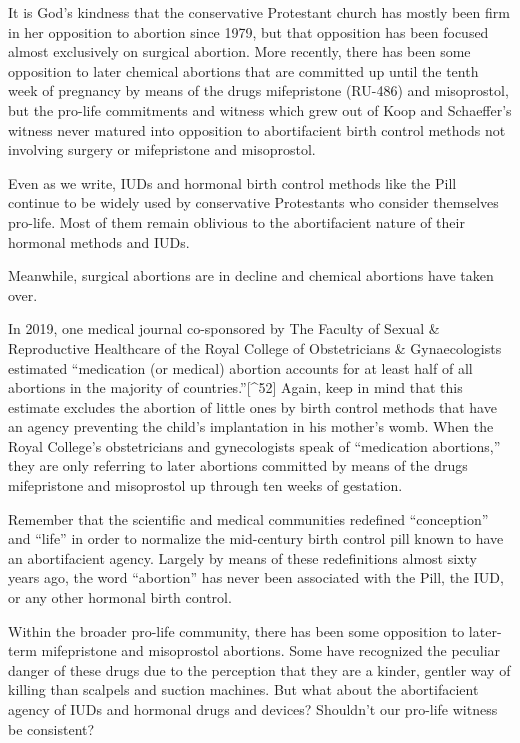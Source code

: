 \documentclass[
]{book}
\begin{document}
It is God's kindness that the conservative Protestant church has mostly been firm in her opposition to abortion since 1979, but that opposition has been focused almost exclusively on surgical abortion. More recently, there has been some opposition to later chemical abortions that are committed up until the tenth week of pregnancy by means of the drugs mifepristone (RU-486) and misoprostol, but the pro-life commitments and witness which grew out of Koop and Schaeffer's witness never matured into opposition to abortifacient birth control methods not involving surgery or mifepristone and misoprostol.

Even as we write, IUDs and hormonal birth control methods like the Pill continue to be widely used by conservative Protestants who consider themselves pro-life. Most of them remain oblivious to the abortifacient nature of their hormonal methods and IUDs.

Meanwhile, surgical abortions are in decline and chemical abortions have taken over.

In 2019, one medical journal co-sponsored by The Faculty of Sexual \& Reproductive Healthcare of the Royal College of Obstetricians \& Gynaecologists estimated ``medication (or medical) abortion accounts for at least half of all abortions in the majority of countries.''{[}\^{}52{]} Again, keep in mind that this estimate excludes the abortion of little ones by birth control methods that have an agency preventing the child's implantation in his mother's womb. When the Royal College's obstetricians and gynecologists speak of ``medication abortions,'' they are only referring to later abortions committed by means of the drugs mifepristone and misoprostol up through ten weeks of gestation.

Remember that the scientific and medical communities redefined ``conception'' and ``life'' in order to normalize the mid-century birth control pill known to have an abortifacient agency. Largely by means of these redefinitions almost sixty years ago, the word ``abortion'' has never been associated with the Pill, the IUD, or any other hormonal birth control.

Within the broader pro-life community, there has been some opposition to later-term mifepristone and misoprostol abortions. Some have recognized the peculiar danger of these drugs due to the perception that they are a kinder, gentler way of killing than scalpels and suction machines. But what about the abortifacient agency of IUDs and hormonal drugs and devices? Shouldn't our pro-life witness be consistent?
\end{document}
